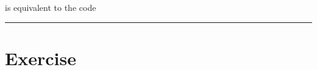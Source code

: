 \documentclass[letterpaper,10pt,english]{jupyterBook}
\begin{document}
\sphinxAtStartPar
is equivalent to the code

\begin{sphinxVerbatim}[commandchars=\\\{\}]
          
\end{sphinxVerbatim}


\bigskip\hrule\bigskip



\part{Exercise}
\label{\detokenize{_pages/1.7_Formatting_code:exercise}} \label{exercise:python-formatting-code-ex}
\end{document}
